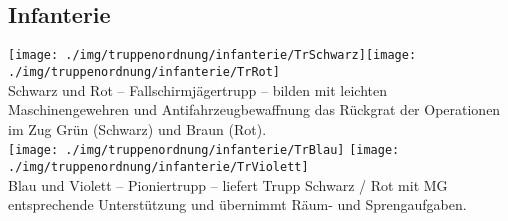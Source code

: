 \subsection{Infanterie}
\texttt{[image: ./img/truppenordnung/infanterie/TrSchwarz]}\quad\texttt{[image: ./img/truppenordnung/infanterie/TrRot]}\\
Schwarz und Rot -- Fallschirmjägertrupp -- bilden mit leichten Maschinengewehren und Antifahrzeugbewaffnung das Rückgrat der Operationen im Zug Grün (Schwarz) und Braun (Rot).\\

\texttt{[image: ./img/truppenordnung/infanterie/TrBlau]} \quad \texttt{[image: ./img/truppenordnung/infanterie/TrViolett]}\\
Blau und Violett -- Pioniertrupp -- liefert Trupp Schwarz / Rot mit MG entsprechende Unterstützung und übernimmt Räum- und Sprengaufgaben.